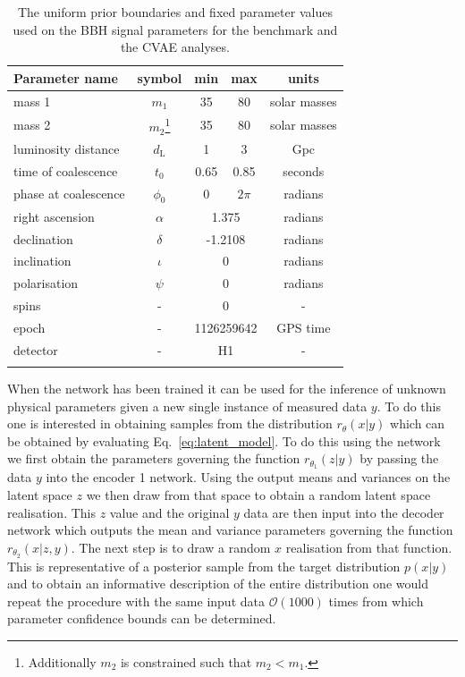 \documentclass[%
showpacs,
 amsmath,amssymb,
 aps,
 twocolumn,
 prl,
 reprint,
floatfix,
]{revtex4-1}
\begin{document}
%
%
\begin{table}
\centering
\caption{The uniform prior boundaries and fixed parameter values used on the \ac{BBH} signal parameters for the benchmark
and the \ac{CVAE} analyses.}
\begin{tabular}[t]{lcccc}
\toprule
Parameter name & symbol & min & max & units \\
\hline
mass 1 & $m_1$ & 35 & 80 & solar masses \\
mass 2 & $m_2$\footnote{Additionally $m_2$ is constrained such that
$m_{2}<m_{1}$.} & 35 & 80 & solar masses \\
luminosity distance & $d_{\text{L}}$ & 1 & 3 & Gpc \\
time of coalescence & $t_{0}$ & 0.65 & 0.85 & seconds \\
phase at coalescence & $\phi_{0}$ & 0 & $2\pi$ & radians \\
\hline
right ascension & $\alpha$ & \multicolumn{2}{c}{1.375} & radians \\
declination & $\delta$ & \multicolumn{2}{c}{-1.2108} & radians \\
inclination & $\iota$ & \multicolumn{2}{c}{0} & radians \\
polarisation & $\psi$ & \multicolumn{2}{c}{0} & radians \\
spins & - & \multicolumn{2}{c}{0} & - \\
epoch & - & \multicolumn{2}{c}{1126259642} & GPS time \\
detector & - & \multicolumn{2}{c}{H1} & - \\
\botrule
\end{tabular}
\label{tab:prior_ranges}
\end{table}

When the network has been trained it can be used for the inference of unknown
physical parameters given a new single instance of measured data $y$. To do
this one is interested in obtaining samples from the distribution
$r_{\theta}(x|y)$ which can be obtained by evaluating
Eq.~\ref{eq:latent_model}. To do this using the network we first obtain the
parameters governing the function $r_{\theta_{1}}(z|y)$ by passing the data $y$
into the encoder 1 network. Using the output means and variances on the latent space
$z$ we then draw from that space to obtain a random latent space realisation.
This $z$ value and the original $y$ data are then input into the decoder network
which outputs the mean and variance parameters governing the function
$r_{\theta_{2}}(x|z,y)$. The next step is to draw a random $x$ realisation from
that function. This is representative of a posterior sample from the target
distribution $p(x|y)$ and to obtain an informative description of the entire
distribution one would repeat the procedure with the same input data
$\mathcal{O}(1000)$ times from which parameter confidence bounds can be
determined.      
\end{document}
